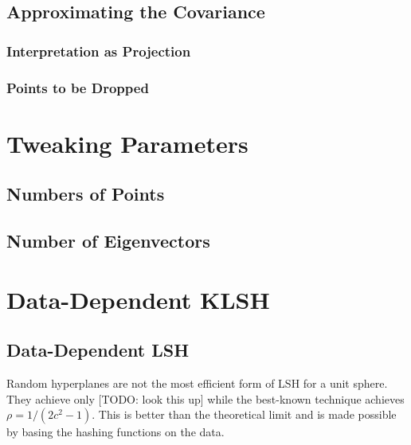 \documentclass[twoside,11pt]{homework}
\begin{document}
\begin{multicols}{2}

\subsection{Approximating the Covariance} %

\subsubsection{Interpretation as Projection} %

\subsubsection{Points to be Dropped} %

\section{Tweaking Parameters} %

\subsection{Numbers of Points}

\subsection{Number of Eigenvectors}

\section{Data-Dependent KLSH} %

\subsection{Data-Dependent LSH}

Random hyperplanes are not the most efficient form of LSH for a unit
sphere.  They achieve only [TODO: look this up] while the best-known
technique achieves $\rho=1/(2c^2-1)$.  This is better than the
theoretical limit and is made possible by basing the hashing functions
on the data.


\end{multicols}
\end{document}
